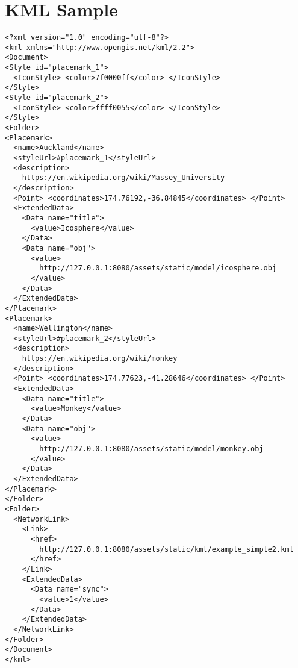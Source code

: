 \chapter{KML Sample}
\label{appendix-kml-sample}

\begin{lstlisting}[language=Kml]
<?xml version="1.0" encoding="utf-8"?>
<kml xmlns="http://www.opengis.net/kml/2.2">
<Document>
<Style id="placemark_1">
  <IconStyle> <color>7f0000ff</color> </IconStyle> 
</Style>
<Style id="placemark_2">
  <IconStyle> <color>ffff0055</color> </IconStyle> 
</Style>
<Folder>
<Placemark>
  <name>Auckland</name>
  <styleUrl>#placemark_1</styleUrl>
  <description>
    https://en.wikipedia.org/wiki/Massey_University
  </description>
  <Point> <coordinates>174.76192,-36.84845</coordinates> </Point>
  <ExtendedData>
    <Data name="title">
      <value>Icosphere</value>
    </Data>
    <Data name="obj">
      <value>
        http://127.0.0.1:8080/assets/static/model/icosphere.obj
      </value>
    </Data>
  </ExtendedData>
</Placemark>
<Placemark>
  <name>Wellington</name>
  <styleUrl>#placemark_2</styleUrl>
  <description>
    https://en.wikipedia.org/wiki/monkey
  </description>
  <Point> <coordinates>174.77623,-41.28646</coordinates> </Point>
  <ExtendedData>
    <Data name="title">
      <value>Monkey</value>
    </Data>
    <Data name="obj">
      <value>
        http://127.0.0.1:8080/assets/static/model/monkey.obj
      </value>
    </Data>
  </ExtendedData>
</Placemark>
</Folder>
<Folder>
  <NetworkLink>
    <Link> 
      <href>
        http://127.0.0.1:8080/assets/static/kml/example_simple2.kml
      </href> 
    </Link>
    <ExtendedData>
      <Data name="sync">
        <value>1</value>
      </Data>
    </ExtendedData>
  </NetworkLink>
</Folder>
</Document>
</kml>
\end{lstlisting}

